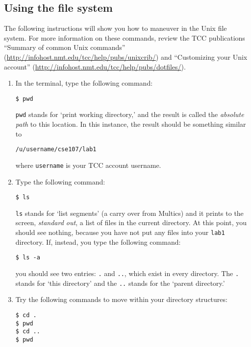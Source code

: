 \documentclass[12pt]{article}
\begin{document}
\subsection{Using the file system}
The following instructions will show you how to maneuver in the Unix file system. For more information on these commands, review the TCC publications ``Summary of common Unix commands'' (\url{http://infohost.nmt.edu/tcc/help/pubs/unixcrib/}) and ``Customizing your Unix account'' (\url{http://infohost.nmt.edu/tcc/help/pubs/dotfiles/}).

\begin{enumerate}

\item In the terminal, type the following command:
\begin{lstlisting}[style=bash]
$ pwd
\end{lstlisting}

\texttt{pwd} stands for `print working directory,' and the result is called the \textit{absolute path} to this location. In this instance, the result should be something similar to

\begin{lstlisting}[style=bash]
/u/username/cse107/lab1
\end{lstlisting}

where \texttt{username} is your TCC account username.

\item Type the following command:
\begin{lstlisting}[style=bash]
$ ls
\end{lstlisting}

\texttt{ls} stands for `list segments' (a carry over from Multics) and it prints to the screen, \textit{standard out}, a list of files in the current directory. At this point, you should see nothing, because you have not put any files into your \texttt{lab1} directory. If, instead, you type the following command:
\begin{lstlisting}[style=bash]
$ ls -a
\end{lstlisting}

you should see two entries: \texttt{.} and \texttt{..}, which exist in every directory. The \texttt{.} stands for `this directory' and the \texttt{..} stands for the `parent directory.'

\item Try the following commands to move within your directory structures:
\begin{lstlisting}[style=bash]
$ cd .
$ pwd
$ cd ..
$ pwd
\end{lstlisting}


\end{enumerate}
\end{document}
